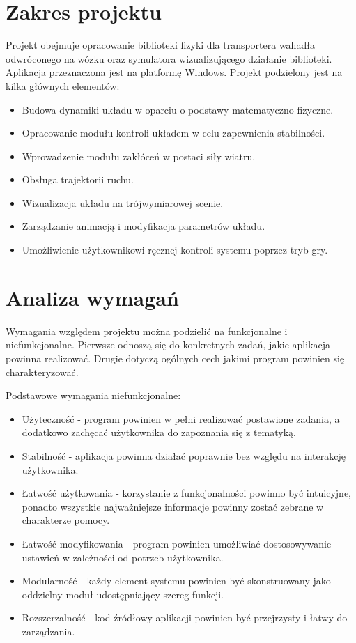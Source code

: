 \documentclass[12pt, oneside]{report}
\theoremstyle{definition}
\begin{document}
\section{Zakres projektu}
Projekt obejmuje opracowanie biblioteki fizyki dla transportera wahadła odwróconego na wózku oraz symulatora wizualizującego działanie biblioteki. Aplikacja przeznaczona jest na platformę Windows. Projekt podzielony jest na kilka głównych elementów:
\begin{itemize}
\item Budowa dynamiki układu w oparciu o podstawy matematyczno-fizyczne.
\item Opracowanie modułu kontroli układem w celu zapewnienia stabilności.
\item Wprowadzenie modułu zakłóceń w postaci siły wiatru.
\item Obsługa trajektorii ruchu.
\item Wizualizacja układu na trójwymiarowej scenie.
\item Zarządzanie animacją i modyfikacja parametrów układu.
\item Umożliwienie użytkownikowi ręcznej kontroli systemu poprzez tryb gry.
\end{itemize}

\section{Analiza wymagań}
Wymagania względem projektu można podzielić na funkcjonalne i niefunkcjonalne. Pierwsze odnoszą się do konkretnych zadań, jakie aplikacja powinna realizować. Drugie dotyczą ogólnych cech jakimi program powinien się charakteryzować.

Podstawowe wymagania niefunkcjonalne:
\begin{itemize}
\item Użyteczność - program powinien w pełni realizować postawione zadania, a dodatkowo zachęcać użytkownika do zapoznania się z tematyką.
\item Stabilność - aplikacja powinna działać poprawnie bez względu na interakcję użytkownika.
\item Łatwość użytkowania - korzystanie z funkcjonalności powinno być intuicyjne, ponadto wszystkie najważniejsze informacje powinny zostać zebrane w charakterze pomocy.
\item Łatwość modyfikowania - program powinien umożliwiać dostosowywanie ustawień w zależności od potrzeb użytkownika. 
\item Modularność - każdy element systemu powinien być skonstruowany jako oddzielny moduł udostępniający szereg funkcji.
\item Rozszerzalność - kod źródłowy aplikacji powinien być przejrzysty i łatwy do zarządzania.
\end{itemize}
\end{document}
